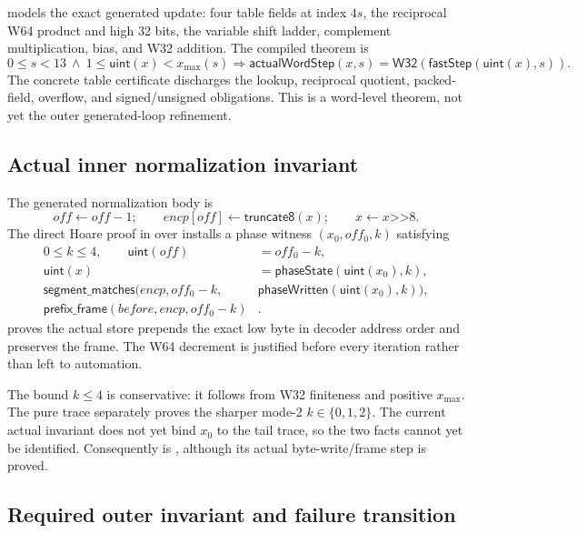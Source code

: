  models the exact generated update:
four table fields at index $4s$, the reciprocal W64 product and high 32 bits,
the variable shift ladder, complement multiplication, bias, and W32 addition.
The compiled theorem is
\[
  0\le s<13\ \land\ 1\le\mathsf{uint}(x)<x_{\max}(s)
  \Longrightarrow
  \mathsf{actualWordStep}(x,s)
  =\mathsf{W32}(\mathsf{fastStep}(\mathsf{uint}(x),s)).
\]
The concrete table certificate discharges the lookup, reciprocal quotient,
packed-field, overflow, and signed/unsigned obligations.  This is a word-level
theorem, not yet the outer generated-loop refinement.

\subsection*{Actual inner normalization invariant}

The generated normalization body is
\[
  off\leftarrow off-1;\qquad
  encp[off]\leftarrow\mathsf{truncate8}(x);\qquad
  x\leftarrow x\mathbin{\texttt{>>}}8.
\]
The direct Hoare proof in  over
 installs a phase witness
$(x_0,off_0,k)$ satisfying
\begin{align*}
 0\le k\le4,\qquad
 \mathsf{uint}(off)&=off_0-k,\\
 \mathsf{uint}(x)&=\mathsf{phaseState}(\mathsf{uint}(x_0),k),\\
 \mathsf{segment\_matches}(encp,off_0-k,
   &\mathsf{phaseWritten}(\mathsf{uint}(x_0),k)),\\
 \mathsf{prefix\_frame}(before,encp,off_0-k)&.
\end{align*}
 proves the actual store prepends the exact
low byte in decoder address order and preserves the frame.  The W64 decrement
is justified before every iteration rather than left to automation.

The bound $k\le4$ is conservative: it follows from W32 finiteness and positive
$x_{\max}$.  The pure trace separately proves the sharper mode-2
$k\in\{0,1,2\}$.  The current actual invariant does not yet bind $x_0$ to the
tail trace, so the two facts cannot yet be identified.  Consequently
 is , although its
actual byte-write/frame step is proved.

\subsection*{Required outer invariant and failure transition}

